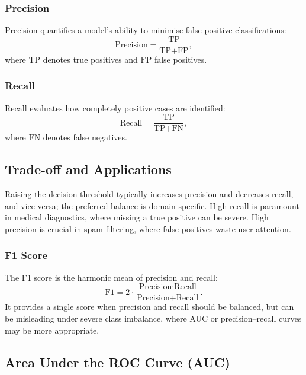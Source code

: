 \subsubsection{Precision}
\label{subsec:precision}

Precision quantifies a model's ability to minimise false-positive classifications:
\begin{equation}
    \text{Precision} = \frac{\text{TP}}{\text{TP} + \text{FP}},
\end{equation}
where $\text{TP}$ denotes true positives and $\text{FP}$ false positives.

\subsubsection{Recall}
\label{subsec:recall}

Recall evaluates how completely positive cases are identified:
\begin{equation}
    \text{Recall} = \frac{\text{TP}}{\text{TP} + \text{FN}},
\end{equation}
where $\text{FN}$ denotes false negatives.

\subsection{Trade-off and Applications}

Raising the decision threshold typically increases precision and decreases recall, and vice versa; the preferred balance is domain-specific.
High recall is paramount in medical diagnostics, where missing a true positive can be severe.
High precision is crucial in spam filtering, where false positives waste user attention.

\subsubsection{F1 Score}
\label{subsec:f1-score}

The F1 score is the harmonic mean of precision and recall:
\begin{equation}
    \text{F1} = 2 \cdot \frac{\text{Precision} \cdot \text{Recall}}{\text{Precision} + \text{Recall}}.
\end{equation}
It provides a single score when precision and recall should be balanced, but can be misleading under severe class imbalance, where \ac{AUC} or precision--recall curves may be more appropriate.

\subsection{Area Under the ROC Curve (AUC)}

